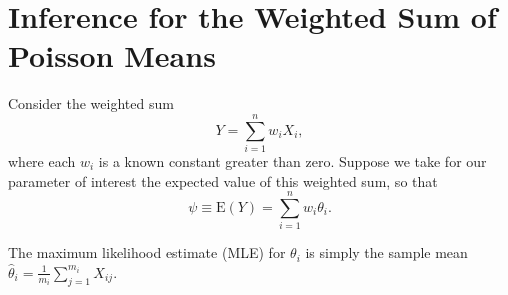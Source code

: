 \documentclass[
  12pt]{article}
\begin{document}
\section{Inference for the Weighted Sum of Poisson
Means}\label{inference-for-the-weighted-sum-of-poisson-means}

Consider the weighted sum \[Y = \sum_{i=1}^n w_iX_i,\] where each
\(w_i\) is a known constant greater than zero. Suppose we take for our
parameter of interest the expected value of this weighted sum, so that
\[\psi \equiv \text{E}(Y) = \sum_{i=1}^n w_i\theta_i.\]

The maximum likelihood estimate (MLE) for \(\theta_i\) is simply the
sample mean \(\hat{\theta}_i = \frac{1}{m_i}\sum_{j=1}^{m_i}X_{ij}\).


\renewcommand\refname{Examples}
  
\end{document}
